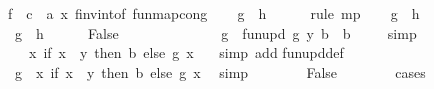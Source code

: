 \begin{isabellebody}
\ {\isacharparenleft}f\ {\isacharcolon}{\isacharcolon}\ {\isacharprime}c\ {\isasymRightarrow}\ {\isacharprime}a{\isacharparenright}\ x{\isacartoucheclose}\ f{\isacharunderscore}inv{\isacharunderscore}into{\isacharunderscore}f\ fun{\isachardot}map{\isacharunderscore}cong{}{\isacharparenright}\isanewline
\ \ \isamarkupfalse%
\ {\isachardoublequoteopen}{\isacharquery}g\ {\isacharequal}\ {\isacharquery}h{\isachardoublequoteclose}\ \isamarkupfalse%
\ {}\ {}\ \isamarkupfalse%
\ {\isacharparenleft}rule\ mp{\isacharparenright}\isanewline
\ \ \isamarkupfalse%
\ {\isachardoublequoteopen}{\isacharquery}g\ {\isasymnoteq}\ {\isacharquery}h{\isachardoublequoteclose}\ \isanewline
\ \ \isamarkupfalse%
\ \isanewline
\ \ \ \ \isamarkupfalse%
\ {}{\isacharcolon}\ {\isachardoublequoteopen}{\isacharquery}g\ {\isacharequal}\ {\isacharquery}h{\isachardoublequoteclose}\isanewline
\ \ \ \ \isamarkupfalse%
\ False\isanewline
\ \ \ \ \isamarkupfalse%
\ {\isacharminus}\isanewline
\ \ \ \ \ \ \isamarkupfalse%
\ {\isachardoublequoteopen}{\isacharquery}g\ {\isacharequal}\ fun{\isacharunderscore}upd\ {\isacharquery}g\ y{}\ {\isacharparenleft}b\ {\isacharcolon}{\isacharcolon}\ {\isacharprime}b{\isacharparenright}{\isachardoublequoteclose}\ \isamarkupfalse%
\ {}\ \isamarkupfalse%
\ simp\isanewline
\ \ \ \ \ \ \isamarkupfalse%
\ \isamarkupfalse%
\ {\isachardoublequoteopen}{\isachardot}{\isachardot}{\isachardot}\ {\isacharequal}\ \ {\isacharparenleft}{\isasymlambda}x{\isachardot}\ if\ x\ {\isacharequal}\ y{}\ then\ b\ else\ {\isacharquery}g\ x{\isacharparenright}{\isachardoublequoteclose}\ \ \isamarkupfalse%
\ {\isacharparenleft}simp\ add{\isacharcolon}\isanewline
fun{\isacharunderscore}upd{\isacharunderscore}def{\isacharparenright}\isanewline
\ \ \ \ \ \ \isamarkupfalse%
\ \isamarkupfalse%
\ {}{\isacharcolon}\ {\isachardoublequoteopen}{\isacharquery}g\ {\isacharequal}\ {\isacharparenleft}{\isasymlambda}x{\isachardot}\ if\ x\ {\isacharequal}\ y{}\ then\ b\ else\ {\isacharquery}g\ x{\isacharparenright}{\isachardoublequoteclose}\ \isamarkupfalse%
\ simp\isanewline
\ \ \ \ \ \ \isamarkupfalse%
\ False\isanewline
\ \ \ \ \ \ \isamarkupfalse%
\ {\isacharparenleft}cases{\isacharparenright}\isanewline

\end{isabellebody}
